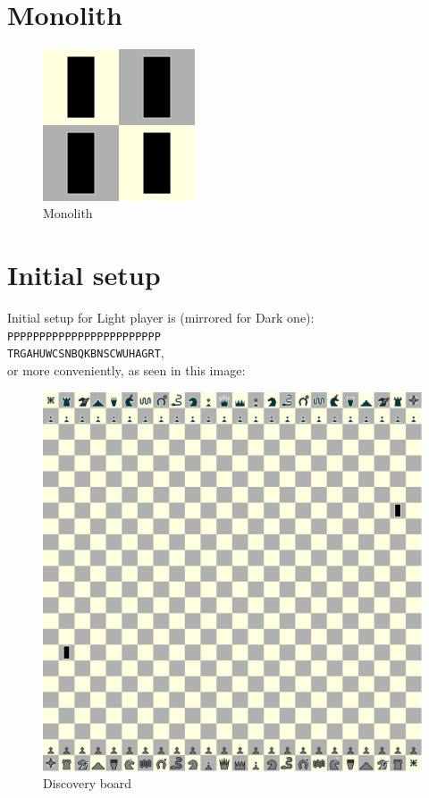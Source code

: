 \documentclass[a5paper,12pt,draft]{book} %
\begin{document}
\clearpage

\section*{Monolith}

\noindent
\begin{figure}
\includegraphics[width=0.4\textwidth, keepaspectratio=true]{../gfx/pieces/15_monolith.png}
\caption{Monolith}
\label{fig:monolith}
\end{figure}

\clearpage

\section*{Initial setup}

Initial setup for Light player is (mirrored for Dark one):
\texttt{PPPPPPPPPPPPPPPPPPPPPPPP \\
        TRGAHUWCSNBQKBNSCWUHAGRT}, \\
or more conveniently, as seen in this image:

\noindent
\begin{figure}[h]
\includegraphics[width=1.0\textwidth, keepaspectratio=true]{../gfx/boards/20_discovery.png}
\caption{Discovery board}
\label{fig:discovery}
\end{figure}
\end{document}
